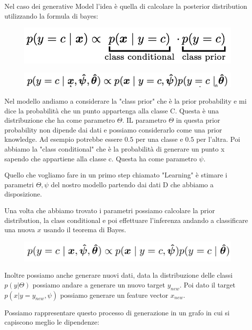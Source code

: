 \documentclass[14pt]{extreport}
\begin{document}
Nel caso dei generative Model l'idea è quella di calcolare la posterior distribution utilizzando la formula di bayes:
\begin{figure}[H]
	\centering
	\includegraphics[width=0.5\linewidth]{158.jpeg}
\end{figure}

\begin{figure}[H]
	\centering
	\includegraphics[width=0.7\linewidth]{201.jpeg}
\end{figure}

Nel modello andiamo a considerare la "class prior" che è la prior probability e mi dice la probabilità che un punto appartenga alla classe C. Questa è
una distribuzione che ha come parametro $\Theta$. IL parametro $\Theta$ in questa prior probability non dipende dai dati e possiamo considerarlo come
una prior knowledge. Ad esempio potrebbe essere $0.5$ per una classe e $0.5$ per l'altra. Poi abbiamo la "class conditional" che è la probabilità di
generare un punto x sapendo che appartiene alla classe c. Questa ha come parametro $\psi$.

Quello che vogliamo fare in un primo step chiamato "Learning" è stimare i parametri ${\Theta, \psi}$ del nostro modello partendo dai dati D che
abbiamo a disposizione.

Una volta che abbiamo trovato i parametri possiamo calcolare la prior distribution, la class conditional e poi effettuare l'inferenza andando a
classificare una nuova $x$ usando il teorema di Bayes.
\begin{figure}[H]
	\centering
	\includegraphics[width=0.7\linewidth]{159.jpeg}
\end{figure}

Inoltre possiamo anche generare nuovi dati, data la distribuzione delle classi $p(y|\Theta)$ possiamo andare a generare un nuovo target $y_{new}$. Poi
dato il target $p(x|y=y_{new}, \psi)$ possiamo generare un feature vector $x_{new}$.

Possiamo rappresentare questo processo di generazione in un grafo in cui si capiscono meglio le dipendenze:
\end{document}
